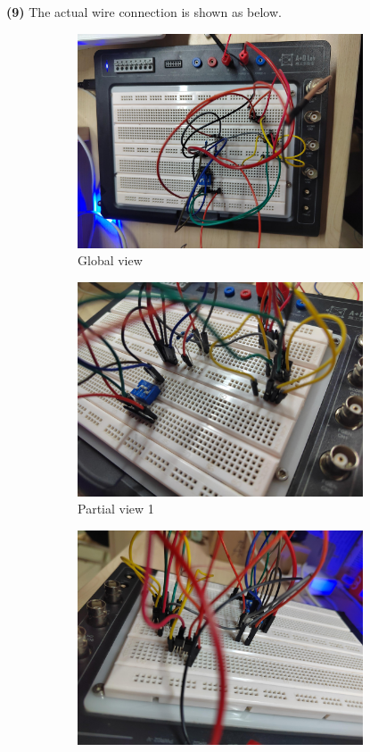\documentclass[UTF8]{report}
\theoremstyle{MyLineTheoremStyle} %
\theoremstyle{MyBlockTheoremStyle} %
\theoremstyle{MySubsubsectionStyle} %
\begin{document}
\noindent\textbf{(9)}
The actual wire connection is shown as below.
\begin{figure}[H]\centering
    \begin{subfigure}[h]{0.48\columnwidth}\centering
        \includegraphics[height=180pt]{assets/Lab1/IMG_20241017_205944.jpg}
        \caption{Global view}
    \end{subfigure}\hfill
    \begin{subfigure}[h]{0.48\columnwidth}\centering
        \includegraphics[height=180pt]{assets/Lab1/IMG_20241017_205937.jpg}
        \caption{Partial view 1}
    \end{subfigure}
    \begin{subfigure}[h]{0.48\columnwidth}\centering
        \includegraphics[height=180pt]{assets/Lab1/IMG_20241017_205950.jpg}

\end{subfigure}
\end{figure}
\end{document}
